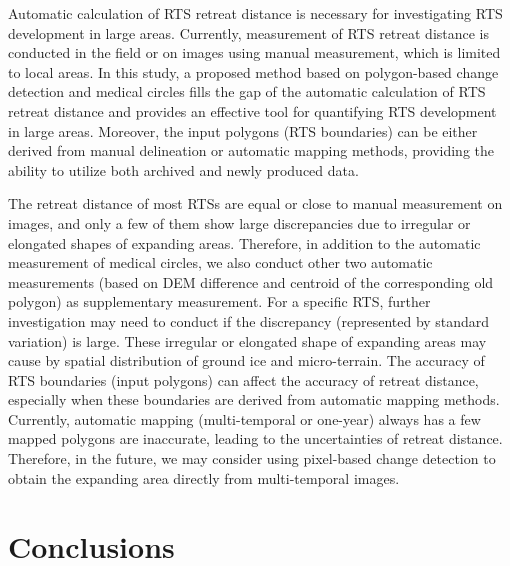 \documentclass[authoryear,preprint,review,12pt]{elsarticle}
\begin{document}
Automatic calculation of RTS retreat distance is necessary for investigating RTS development in large areas.
Currently, measurement of RTS retreat distance is conducted in the field or on images using manual measurement, which is limited to local areas. 
In this study, a proposed method based on polygon-based change detection and medical circles fills the gap of the automatic calculation of RTS retreat distance 
and provides an effective tool for quantifying RTS development in large areas. 
Moreover, the input polygons (RTS boundaries) can be either derived from manual delineation or automatic mapping methods, 
providing the ability to utilize both archived and newly produced data.


The retreat distance of most RTSs are equal or close to manual measurement on images, and only a few of them show large discrepancies due to irregular or elongated shapes of expanding areas. 
Therefore, in addition to the automatic measurement of medical circles, we also conduct other two automatic measurements (based on DEM difference and centroid of the corresponding old polygon) as supplementary measurement. 
For a specific RTS, further investigation may need to conduct if the discrepancy (represented by standard variation) is large. 
These irregular or elongated shape of expanding areas may cause by spatial distribution of ground ice and micro-terrain.
The accuracy of RTS boundaries (input polygons) can affect the accuracy of retreat distance, especially when these boundaries are derived from automatic mapping methods. 
Currently, automatic mapping (multi-temporal or one-year) always has a few mapped polygons are inaccurate, leading to the uncertainties of retreat distance. 
Therefore, in the future, we may consider using pixel-based change detection to obtain the expanding area directly from multi-temporal images. 



%


\section{Conclusions}
\label{sec_conclusion}
\end{document}
